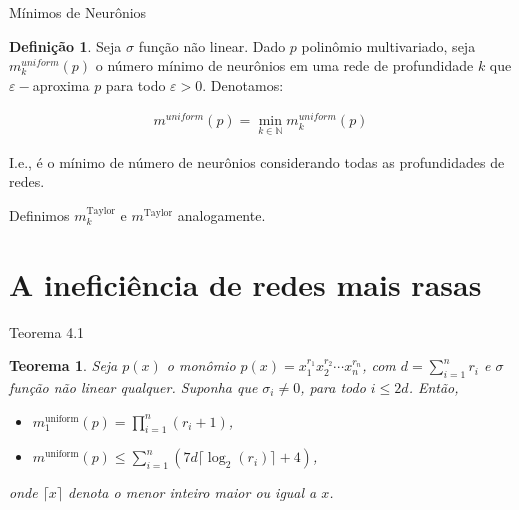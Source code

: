 \documentclass{beamer}
\newtheorem{teo}{Teorema}[section]
\theoremstyle{definition}
\newtheorem{defin}{Definição}[section]
\begin{document}
\begin{frame}{Mínimos de Neurônios}
    \begin{defin}
        Seja $\sigma$ função não linear. Dado $p$ polinômio multivariado, seja $m_k^{uniform}(p)$ o número mínimo de neurônios em uma rede de profundidade $k$ que $\varepsilon-$aproxima $p$ para todo $\varepsilon>0$. \pause Denotamos:

        \begin{align*}
            m^{uniform}(p) = \min_{k \in \mathbb N} m_k^{uniform}(p)
        \end{align*}

        \pause

        I.e., é o mínimo de número de neurônios considerando todas as profundidades de redes.

        \pause

        \vspace{1em}

        Definimos $m_k^\text{Taylor}$ e $m^\text{Taylor}$ analogamente.
    \end{defin}
\end{frame}

\section{A ineficiência de redes mais rasas}
\begin{frame}
    \tableofcontents[currentsection]
\end{frame}

\begin{frame}{Teorema 4.1}
    
    \begin{teo}
        
        Seja $p(x)$ o monômio $p(x) = x_1^{r_1} x_2^{r_2} \cdots x_n^{r_n}$, com $d = \sum_{i=1}^{n} r_i$ e $\sigma$ função não linear qualquer. Suponha que $\sigma_i \neq 0$, para todo $i\leq 2d$. Então,
        \begin{itemize}
          \item[(i)] $m_1^{\text{uniform}}(p) = \prod_{i=1}^{n}(r_i + 1)$,
          \item[(ii)] $m^{\text{uniform}}(p) \leq \sum_{i=1}^{n} \left(7d\lceil \log_2(r_i) \rceil + 4\right)$,
        \end{itemize}
        onde $\lceil x \rceil$ denota o menor inteiro maior ou igual a $x$. 
    
    \end{teo}
\end{frame}
\end{document}

